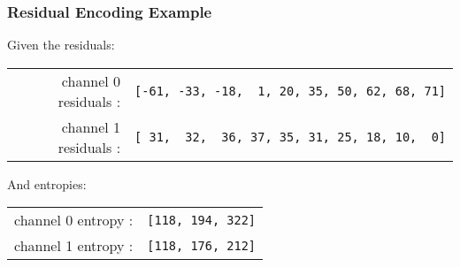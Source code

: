 \clearpage


\subsubsection{Residual Encoding Example}
{
  Given the residuals:
  \newline
  \begin{tabular}{rr}
    channel 0 residuals : & \texttt{[-61,~-33,~-18,~~1,~20,~35,~50,~62,~68,~71]}\\
    channel 1 residuals : & \texttt{[~31,~~32,~~36,~37,~35,~31,~25,~18,~10,~~0]}\\
  \end{tabular}
  \newline
  And entropies:
  \newline
  \begin{tabular}{rr}
    channel 0 entropy : & \texttt{[118, 194, 322]} \\
    channel 1 entropy : & \texttt{[118, 176, 212]} \\
  \end{tabular}
}

